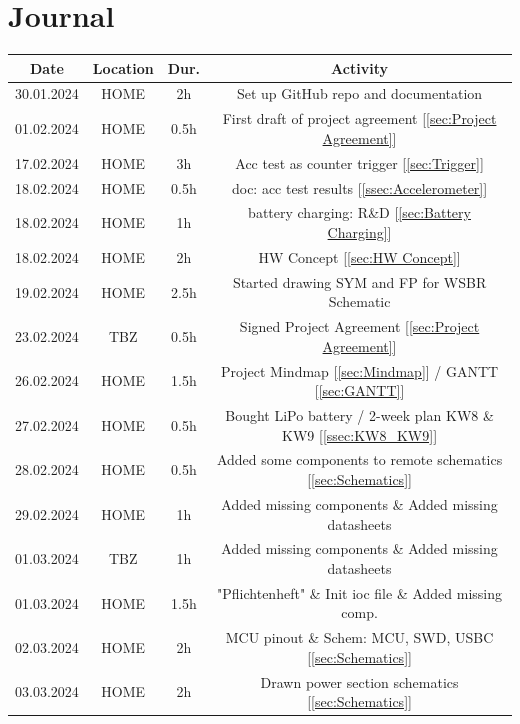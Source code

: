 \section{Journal}
\label{sec:Journal}
\begin{table}[H]
    \centering
\begin{tabular}{||c | c | c || c||} 
 \hline
 Date &  Location & Dur. & Activity \\ [0.5ex] 
 \hline\hline
    30.01.2024 & HOME & 2h & Set up GitHub repo and documentation \\   
 \hline
    01.02.2024 & HOME & 0.5h & First draft of project agreement [\ref{sec:Project Agreement}] \\ 
 \hline
    17.02.2024 & HOME & 3h & Acc test as counter trigger [\ref{sec:Trigger}] \\ 
 \hline
    18.02.2024 & HOME & 0.5h & doc: acc test results [\ref{ssec:Accelerometer}] \\ 
 \hline
    18.02.2024 & HOME & 1h & battery charging: R\&D [\ref{sec:Battery Charging}] \\ 
 \hline
    18.02.2024 & HOME & 2h & HW Concept [\ref{sec:HW Concept}] \\ 
 \hline
    19.02.2024 & HOME & 2.5h & Started drawing SYM and FP for WSBR Schematic \\ 
 \hline
    23.02.2024 & TBZ & 0.5h & Signed Project Agreement [\ref{sec:Project Agreement}] \\ 
 \hline
    26.02.2024 & HOME & 1.5h & Project Mindmap [\ref{sec:Mindmap}] / GANTT [\ref{sec:GANTT}] \\ 
 \hline
    27.02.2024 & HOME & 0.5h & Bought LiPo battery / 2-week plan KW8 \& KW9 [\ref{ssec:KW8_KW9}] \\ 
 \hline
    28.02.2024 & HOME & 0.5h & Added some components to remote schematics [\ref{sec:Schematics}] \\ 
 \hline
    29.02.2024 & HOME & 1h & Added missing components \& Added missing datasheets \\ 
 \hline
    01.03.2024 & TBZ & 1h & Added missing components \& Added missing datasheets \\ 
 \hline
    01.03.2024 & HOME & 1.5h & "Pflichtenheft" \& Init ioc file \& Added missing comp. \\ 
 \hline
    02.03.2024 & HOME & 2h & MCU pinout \& Schem: MCU, SWD, USBC [\ref{sec:Schematics}] \\ 
 \hline
    03.03.2024 & HOME & 2h & Drawn power section schematics [\ref{sec:Schematics}] \\ 

\end{tabular}
\end{table}
